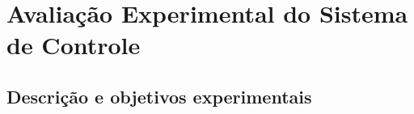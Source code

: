 \chapter{Avaliação Experimental do Sistema de Controle}
\section{Descrição e objetivos experimentais}
